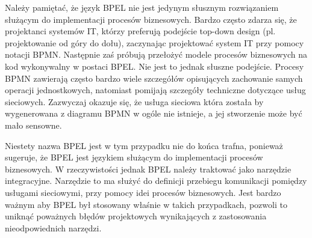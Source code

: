 Należy pamiętać, że język BPEL nie jest jedynym słusznym rozwiązaniem służącym do implementacji procesów biznesowych. Bardzo często  zdarza się, że projektanci systemów IT, którzy preferują podejście top-down design (pl. projektowanie od góry do dołu), zaczynając projektować system IT przy pomocy notacji BPMN. Następnie zaś próbują przełożyć modele procesów biznesowych na kod wykonywalny w postaci BPEL. Nie jest to jednak słuszne podejście. Procesy BPMN zawierają często bardzo wiele szczegółów opisujących zachowanie samych operacji jednostkowych, natomiast pomijają szczegóły techniczne dotyczące usług sieciowych.  Zazwyczaj okazuje się, że usługa sieciowa która została by wygenerowana z diagramu BPMN w ogóle nie istnieje, a jej stworzenie może być mało sensowne.

Niestety nazwa BPEL jest w tym przypadku nie do końca trafna, ponieważ sugeruje, że BPEL jest językiem służącym do implementacji procesów biznesowych. W rzeczywistości jednak BPEL należy traktować jako narzędzie integracyjne. Narzędzie to ma służyć do definicji przebiegu komunikacji pomiędzy usługami sieciowymi, przy pomocy idei procesów biznesowych. Jest bardzo ważnym aby BPEL był stosowany właśnie w takich przypadkach, pozwoli to uniknąć poważnych błędów projektowych wynikających z zastosowania nieodpowiednich narzędzi.  
